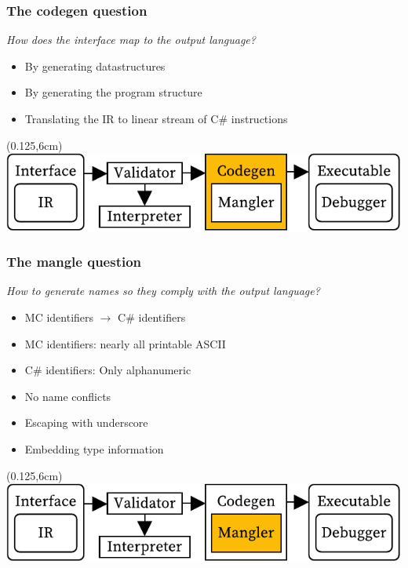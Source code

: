 \documentclass[xetex,serif,aspectratio=169]{beamer}
\begin{document}
\begin{frame}[t]
\end{frame}\begin{frame}[t]\frametitle{The codegen question}
\textit{How does the interface map to the output language?}
\begin{itemize}
    \item By generating datastructures
    \item By generating the program structure
    \item Translating the IR to linear stream of C\# instructions
\end{itemize}
\begin{textblock*}{0.75\paperwidth}(0.125\paperwidth,6cm)\includegraphics[width=0.75\paperwidth]{overview_codegen}\end{textblock*}

\end{frame}\begin{frame}[t]\frametitle{The mangle question}
\textit{How to generate names so they comply with the output language?}
\begin{itemize}
    \item MC identifiers $\longrightarrow$ C\# identifiers
    \item MC identifiers: nearly all printable ASCII
    \item C\# identifiers: Only alphanumeric
    \item No name conflicts
    \item Escaping with underscore
    \item Embedding type information
\end{itemize}
\begin{textblock*}{0.75\paperwidth}(0.125\paperwidth,6cm)\includegraphics[width=0.75\paperwidth]{overview_mangler}\end{textblock*}


\end{frame}
\end{document}

